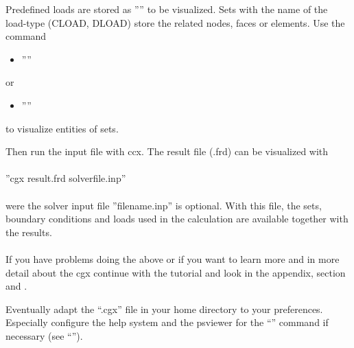 \documentclass{article}
\begin{document}
Predefined loads are stored as '''' to be visualized. Sets with the name of the load-type (CLOAD, DLOAD) store the related nodes, faces or elements. Use the command
\begin{itemize}
\item ''''
\end{itemize}
or
\begin{itemize}
\item ''''
\end{itemize}
to visualize entities of sets.

Then run the input file with ccx. The result file (.frd) can be visualized with\\\\  ''cgx result.frd solverfile.inp''\\\\were the solver input file ''filename.inp'' is optional. With this file, the sets, boundary conditions and loads used in the calculation are available together with the results.\\\\If you have problems doing the above or if you want to learn more and in more detail about the cgx continue with the tutorial \cite{tutorial} and look in the appendix, section  and .    

Eventually adapt the ``.cgx'' file in your home directory to your preferences. Especially configure the help system and the psviewer for the ``'' command if necessary (see ``'').
\end{document}
